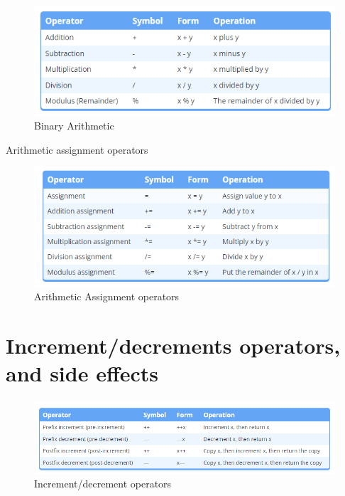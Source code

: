 \documentclass[
  letterpaper,
  DIV=11,
  numbers=noendperiod]{scrreprt}
\begin{document}
\begin{figure}

\includegraphics{./figure/binaryAri.PNG} \hfill{}

\caption{Binary Arithmetic}

\end{figure}

Arithmetic assignment operators

\begin{figure}

{\centering \includegraphics{./figure/assignArithmetic.PNG}

}

\caption{Arithmetic Assignment operators}

\end{figure}

\hypertarget{incrementdecrements-operators-and-side-effects}{%
\section{Increment/decrements operators, and side
effects}\label{incrementdecrements-operators-and-side-effects}}

\begin{figure}

{\centering \includegraphics{./figure/increment_decrement_operators.PNG}

}

\caption{Increment/decrement operators}

\end{figure}
\end{document}
